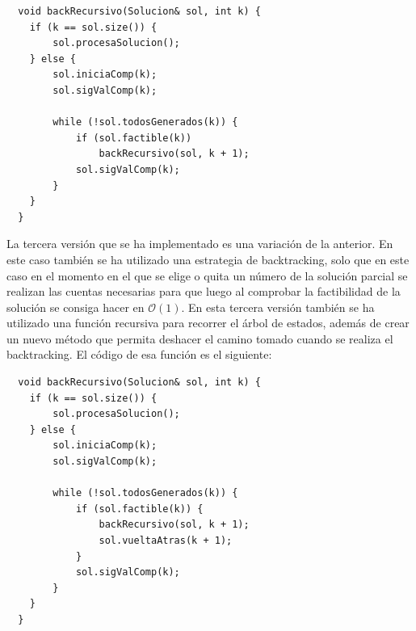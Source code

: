 \documentclass{article}
\begin{document}
  \begin{lstlisting}
  void backRecursivo(Solucion& sol, int k) {
    if (k == sol.size()) {
        sol.procesaSolucion();
    } else {
        sol.iniciaComp(k);
        sol.sigValComp(k);

        while (!sol.todosGenerados(k)) {
            if (sol.factible(k))
                backRecursivo(sol, k + 1);
            sol.sigValComp(k);
        }
    }
  }
  \end{lstlisting}
  La tercera versión que se ha implementado es una variación de la anterior. En este caso también se ha utilizado una estrategia de backtracking, solo que en este caso en el momento en el que se elige o quita un número de la solución parcial se realizan las cuentas necesarias para que luego al comprobar la factibilidad de la solución se consiga hacer en $\mathcal{O}(1)$. En esta tercera versión también se ha utilizado una función recursiva para recorrer el árbol de estados, además de crear un nuevo método que permita deshacer el camino tomado cuando se realiza el backtracking. El código de esa función es el siguiente:
  \begin{lstlisting}
  void backRecursivo(Solucion& sol, int k) {
    if (k == sol.size()) {
        sol.procesaSolucion();
    } else {
        sol.iniciaComp(k);
        sol.sigValComp(k);

        while (!sol.todosGenerados(k)) {
            if (sol.factible(k)) {
                backRecursivo(sol, k + 1);
                sol.vueltaAtras(k + 1);
            }
            sol.sigValComp(k);
        }
    }
  }
  \end{lstlisting}
  
\end{document}
